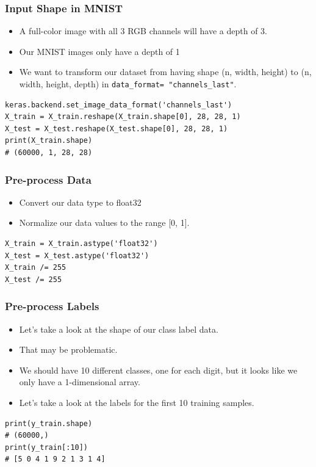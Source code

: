 \begin{frame}[fragile] \frametitle{Input Shape in MNIST}

\begin{itemize}
\item A full-color image with all 3 RGB channels will have a depth of 3.
\item Our MNIST images only have a depth of 1
\item We want to transform our dataset from having shape (n, width, height) to (n, width, height, depth) in \lstinline|data_format= "channels_last"|.
\end{itemize}
\begin{lstlisting}
keras.backend.set_image_data_format('channels_last')
X_train = X_train.reshape(X_train.shape[0], 28, 28, 1)
X_test = X_test.reshape(X_test.shape[0], 28, 28, 1)
print(X_train.shape)
# (60000, 1, 28, 28)
\end{lstlisting}
\end{frame}


\begin{frame}[fragile] \frametitle{Pre-process Data}

\begin{itemize}
\item Convert our data type to float32
\item Normalize our data values to the range [0, 1].
\end{itemize}
\begin{lstlisting}
X_train = X_train.astype('float32')
X_test = X_test.astype('float32')
X_train /= 255
X_test /= 255
\end{lstlisting}
\end{frame}

\begin{frame}[fragile] \frametitle{Pre-process Labels}

\begin{itemize}
\item Let's take a look at the shape of our class label data.
\item That may be problematic.
\item We should have 10 different classes, one for each digit, but it looks like we only have a 1-dimensional array.
\item Let's take a look at the labels for the first 10 training samples.
\end{itemize}
\begin{lstlisting}
print(y_train.shape)
# (60000,)
print(y_train[:10])
# [5 0 4 1 9 2 1 3 1 4]
\end{lstlisting}
\end{frame}


